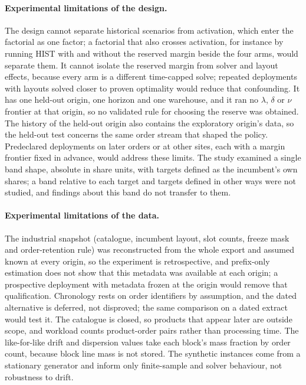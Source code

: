 \paragraph{Experimental limitations of the design.} The design cannot separate historical scenarios from activation, which enter the factorial as one factor; a factorial that also crosses activation, for instance by running HIST with and without the reserved margin beside the four arms, would separate them. It cannot isolate the reserved margin from solver and layout effects, because every arm is a different time-capped solve; repeated deployments with layouts solved closer to proven optimality would reduce that confounding. It has one held-out origin, one horizon and one warehouse, and it ran no $\lambda$, $\delta$ or $\nu$ frontier at that origin, so no validated rule for choosing the reserve was obtained. The history of the held-out origin also contains the exploratory origin's data, so the held-out test concerns the same order stream that shaped the policy. Predeclared deployments on later orders or at other sites, each with a margin frontier fixed in advance, would address these limits. The study examined a single band shape, absolute in share units, with targets defined as the incumbent's own shares; a band relative to each target and targets defined in other ways were not studied, and findings about this band do not transfer to them.

\paragraph{Experimental limitations of the data.} The industrial snapshot (catalogue, incumbent layout, slot counts, freeze mask and order-retention rule) was reconstructed from the whole export and assumed known at every origin, so the experiment is retrospective, and prefix-only estimation does not show that this metadata was available at each origin; a prospective deployment with metadata frozen at the origin would remove that qualification. Chronology rests on order identifiers by assumption, and the dated alternative is deferred, not disproved; the same comparison on a dated extract would test it. The catalogue is closed, so products that appear later are outside scope, and workload counts product-order pairs rather than processing time. The like-for-like drift and dispersion values take each block's mass fraction by order count, because block line mass is not stored. The synthetic instances come from a stationary generator and inform only finite-sample and solver behaviour, not robustness to drift.


